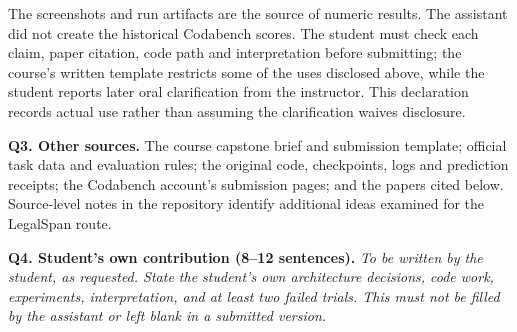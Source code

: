 \documentclass[11pt,oneside]{article}
\begin{document}
The screenshots and run artifacts are the source of numeric results. The assistant did not create the historical Codabench scores. The student must check each claim, paper citation, code path and interpretation before submitting; the course's written template restricts some of the uses disclosed above, while the student reports later oral clarification from the instructor. This declaration records actual use rather than assuming the clarification waives disclosure.

\textbf{Q3. Other sources.} The course capstone brief and submission template; official task data and evaluation rules; the original code, checkpoints, logs and prediction receipts; the Codabench account's submission pages; and the papers cited below. Source-level notes in the repository identify additional ideas examined for the LegalSpan route.

\textbf{Q4. Student's own contribution (8--12 sentences).} \emph{To be written by the student, as requested. State the student's own architecture decisions, code work, experiments, interpretation, and at least two failed trials. This must not be filled by the assistant or left blank in a submitted version.}



\end{document}
